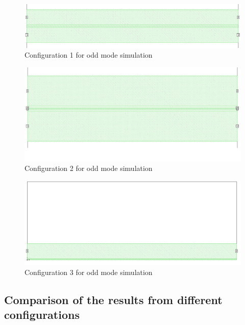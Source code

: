 \documentclass[noshowpacs,amsmath,
superscriptaddress,
10pt]{article}
\begin{document}
\begin{figure}[!ht]
\centering
\includegraphics[width=15cm] {Odd_cfg1}
\caption{Configuration 1 for odd mode simulation}
\label{pic:Odd_cfg1}
\end{figure}

\begin{figure}[!ht]
\centering
\includegraphics[width=15cm] {Odd_cfg2}
\caption{Configuration 2 for odd mode simulation}
\label{pic:Odd_cfg2}
\end{figure}

\begin{figure}[!ht]
\centering
\includegraphics[width=15cm] {Odd_cfg3}
\caption{Configuration 3 for odd mode simulation}
\label{pic:Odd_cfg3}
\end{figure}

\subsection{Comparison of the results from different configurations} 
\end{document}
